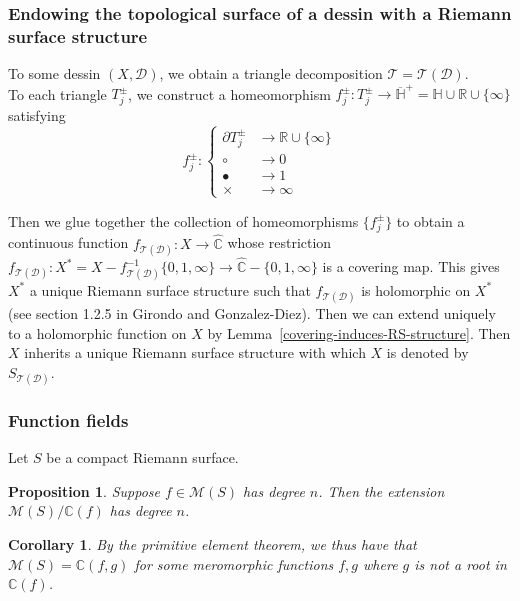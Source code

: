 \documentclass[reqno]{amsart}
\newtheorem{proposition}[theorem]{Proposition}
\newtheorem{corollary}[theorem]{Corollary}
\theoremstyle{definition}
\theoremstyle{remark}
\begin{document}
\subsubsection{Endowing the topological surface of a dessin with a Riemann surface structure}
To some dessin $(X, \mathcal{D})$, we
obtain a triangle decomposition
$\mathcal{T} = \mathcal{T}(\mathcal{D})$.\\
To each triangle
$T_j^{\pm}$, we construct a homeomorphism
$f_j^{\pm} \colon T_j^{\pm}
\to \overline{\mathbb{H}}^+ =
\mathbb{H} \cup \mathbb{R}\cup 
\{ \infty\}$
 satisfying
 \[
f_j^{\pm} \colon
\begin{cases}
    \partial T_j^{\pm} &\longrightarrow  \mathbb{R}\cup
    \{\infty\}\\
    \circ &\longrightarrow  0\\
    \bullet &\longrightarrow 1\\
    \times &\longrightarrow  \infty
\end{cases}
 \]

Then we glue together the collection
of homeomorphisms $\{f_j^{\pm}\}$
to obtain a continuous function
$f_{\mathcal{T}(\mathcal{D})} \colon X
\to \hat{\mathbb{C}}$ whose restriction
$f_{\mathcal{T}(\mathcal{D})} \colon
X^* = X - f_{\mathcal{T}(\mathcal{D})}^{-1} \{0,1,\infty\} \to
\hat{\mathbb{C}}- \{0,1,\infty\}$ is
a covering map. This gives
$X^*$ a unique Riemann surface structure such that
$f_{\mathcal{T}(\mathcal{D})}$ is holomorphic on $X^*$ (see section 1.2.5 in Girondo and Gonzalez-Diez). Then we can extend uniquely to
a holomorphic function on
$X$ by Lemma~\ref{covering-induces-RS-structure}.
Then $X$ inherits a unique
Riemann surface structure with which $X$ is denoted by
$S_{\mathcal{T}(\mathcal{D})}$.

\subsubsection{Function fields}
Let $S$ be a compact
Riemann surface.
\begin{proposition}
    Suppose
    $f \in \mathcal{M}(S)$ has degree
    $n$. Then the extension
    $\mathcal{M}(S) /
    \mathbb{C}(f)$
    has degree $n$.
\end{proposition}

\begin{corollary}
    By the primitive
    element theorem, we thus have that
    $\mathcal{M}(S)
    = \mathbb{C}(f,g)
    $ for some
    meromorphic functions $f,g$
    where $g$ is
    not a root in
    $\mathbb{C}(f)$.
\end{corollary}
\end{document}
